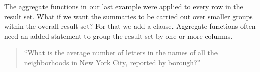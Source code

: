 \documentclass[a4paper,11pt,english]{sphinxmanual}
\begin{document}
\begin{sphinxVerbatim}[commandchars=\\\{\}]
  
   
     
\end{sphinxVerbatim}

\begin{sphinxVerbatim}[commandchars=\\\{\}]
                         
   
\end{sphinxVerbatim}

The aggregate functions in our last example were applied to every row in the result set. What if we want the summaries to be carried out over smaller groups within the overall result set? For that we add a  clause. Aggregate functions often need an added  statement to group the result-set by one or more columns.
\begin{quote}

“What is the average number of letters in the names of all the neighborhoods in New York City, reported by borough?”
\end{quote}

\begin{sphinxVerbatim}[commandchars=\\\{\}]
   
   
    
\end{sphinxVerbatim}
\end{document}

